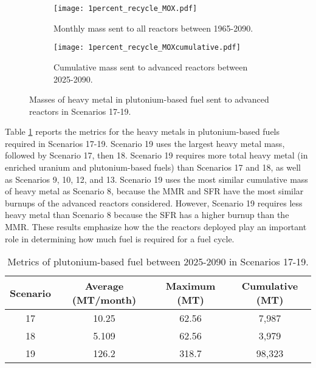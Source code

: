 \begin{figure}[h!]
    \centering
    \begin{subfigure}[b]{0.45\textwidth}
        \centering
        \texttt{[image: 1percent\_recycle\_MOX.pdf]}
        \caption{Monthly mass sent to all reactors 
        between 1965-2090.}
        \label{fig:1percent_recycle_AR_mox}
    \end{subfigure}
    \hfill
    \begin{subfigure}[b]{0.45\textwidth}
        \centering
        \texttt{[image: 1percent\_recycle\_MOXcumulative.pdf]}
        \caption{Cumulative mass  
        sent to advanced reactors between 2025-2090.}
        \label{fig:1percent_recycle_mox_cumulative}
    \end{subfigure}
       \caption{Masses of heavy metal in plutonium-based fuel 
        sent to advanced reactors
        in Scenarios 17-19.}
       \label{fig:1percent_recycle_mox}
\end{figure}

Table \ref{tab:s17-19_mox} reports the metrics for the
heavy metals in plutonium-based 
fuels required in Scenarios 17-19. Scenario 19 uses the largest 
heavy metal mass, followed by Scenario 17, then 18. 
Scenario 19 requires more total heavy metal (in enriched 
uranium and plutonium-based fuels) than Scenarios 
17 and 18, as well as Scenarios 9, 10, 12, and 13. Scenario 19 
uses the most similar cumulative mass of heavy metal as Scenario 8, 
because the \gls{MMR} and \gls{SFR} have the most similar burnups 
of the advanced reactors considered. However, Scenario 19 requires 
less heavy metal than Scenario 8 because the \gls{SFR} has a higher 
burnup than the \gls{MMR}. These results emphasize how the 
the reactors deployed play an important role in determining how 
much fuel is required for a fuel cycle.  

\begin{table}[h!]
    \centering 
    \caption{Metrics of plutonium-based fuel between 2025-2090 in Scenarios 
    17-19.}
    \label{tab:s17-19_mox}
    \begin{tabular}{c c c c}
        \hline 
        Scenario & Average (MT/month) & Maximum (MT) & Cumulative (MT) \\
        \hline
        17 & 10.25 & 62.56 & 7,987\\
        18 & 5.109 & 62.56 & 3,979\\
        19 & 126.2 & 318.7 & 98,323\\
        \hline
    \end{tabular}
\end{table}

